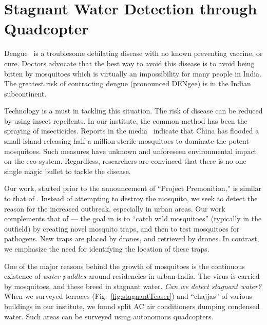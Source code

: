 \chapter[Stagnant Water Detection]{Stagnant Water Detection through Quadcopter}
Dengue~\cite{WHO15Dengue} is a troublesome debilating disease with no
known preventing vaccine, or cure. Doctors advocate that the best way
to avoid this disease is to avoid being bitten by mosquitoes which is
virtually an impossibility for many people in India.  The greatest
risk of contracting dengue (pronounced DENgee) is in the Indian
subcontinent.  

Technology is a must in tackling this situation.  The risk of disease
can be reduced by using insect repellents. In our institute, the
common method has been the spraying of insecticides.  Reports in the
media~\cite{china} indicate that China has flooded a small island
releasing half a million sterile mosquitoes to dominate the potent
mosquitoes. Such measures have unknown and unforeseen environmental
impact on the eco-system. Regardless, researchers are convinced that
there is no one single magic bullet to tackle the disease. 

Our work, started prior to the announcement of ``Project
Premonition,'' is similar to that of \cite{Microsoft15}.  Instead of
attempting to destroy the mosquito, we seek to detect the reason for
the increased outbreak, especially in urban areas.  Our work complements that
of \cite{Microsoft15} --- the goal in \cite{Microsoft15} is to ``catch wild
mosquitoes'' (typically in the outfield) by creating novel mosquito traps, and
then to test mosquitoes for pathogens. New traps are placed by drones, and
retrieved by drones. In contrast, we emphasize the need for
identifying the location of these traps.  

One of the major reasons behind the growth of mosquitoes is the
continuous existence of \emph{water puddles} around residencies in
urban India.  The virus is carried by mosquitoes, and these breed in
stagnant water. \emph{Can we detect stagnant water?}  When we surveyed
terraces (Fig.~\ref{fig:stagnantTeaser}) and ``chajjas'' of various buildings in
our institute, we found split AC air conditioners dumping condensed
water. Such areas can be surveyed using autonomous quadcopters.

